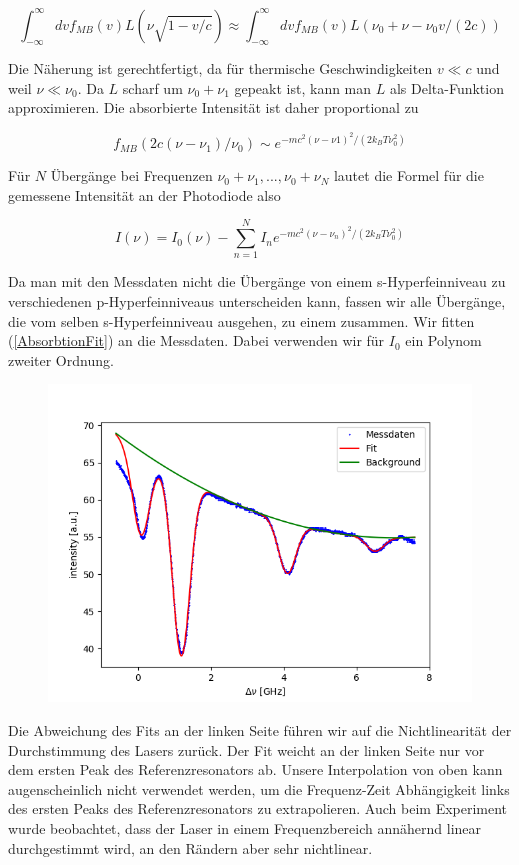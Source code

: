 \documentclass[a4paper,parskip]{scrartcl}
\begin{document}
$$\int_{-\infty}^{\infty} dv f_{MB}(v)L(\nu\sqrt{1-v/c}) \approx \int_{-\infty}^{\infty} dv f_{MB}(v)L(\nu_0+\nu-\nu_0 v/(2c))$$

Die Näherung ist gerechtfertigt, da für thermische Geschwindigkeiten $v \ll c$ und weil $\nu \ll \nu_0$. Da $L$ scharf um $\nu_0 + \nu_1$ gepeakt ist, kann man $L$ als Delta-Funktion approximieren. Die absorbierte Intensität ist daher proportional zu

$$f_{MB}(2c(\nu-\nu_1)/\nu_0) \sim e^{-mc^2(\nu-\nu1)^2/(2k_BT\nu_0^2)}$$

Für $N$ Übergänge bei Frequenzen $\nu_0+\nu_1,...,\nu_0+\nu_N$ lautet die Formel für die gemessene Intensität an der Photodiode also

\begin{equation}
I(\nu) = I_0(\nu) - \sum_{n=1}^N I_n e^{-mc^2(\nu-\nu_n)^2/(2k_BT\nu_0^2)}
\label{AbsorbtionFit}
\end{equation}

Da man mit den Messdaten nicht die Übergänge von einem s-Hyperfeinniveau zu verschiedenen p-Hyperfeinniveaus unterscheiden kann, fassen wir alle Übergänge, die vom selben s-Hyperfeinniveau ausgehen, zu einem zusammen. Wir fitten (\ref{AbsorbtionFit}) an die Messdaten. Dabei verwenden wir für $I_0$ ein Polynom zweiter Ordnung.

\begin{figure}[h]
\centering
\includegraphics[scale = 0.5]{./absorbtion/fit.png}
\end{figure}

Die Abweichung des Fits an der linken Seite führen wir auf die Nichtlinearität der Durchstimmung des Lasers zurück. Der Fit weicht an der linken Seite nur vor dem ersten Peak des Referenzresonators ab. Unsere Interpolation von oben kann augenscheinlich nicht verwendet werden, um die Frequenz-Zeit Abhängigkeit links des ersten Peaks des Referenzresonators zu extrapolieren. Auch beim Experiment wurde beobachtet, dass der Laser in einem Frequenzbereich annähernd linear durchgestimmt wird, an den Rändern aber sehr nichtlinear.
\end{document}
